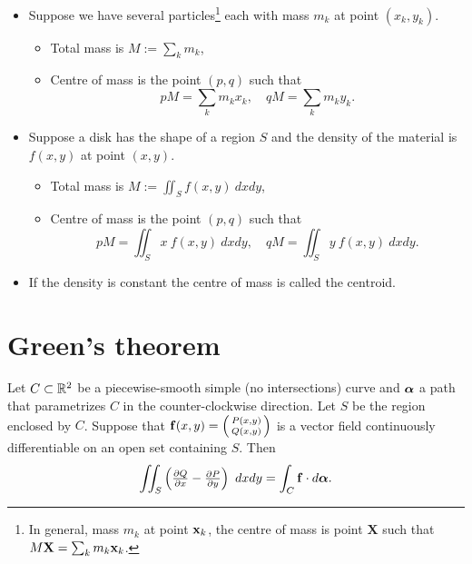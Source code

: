 \begin{itemize}
    \item Suppose we have several particles\footnote{In general, mass \(m_k\) at point \(\mathbf{x}_k\), the centre of mass is point \(\mathbf{X}\) such that \( M\mathbf{X} = \sum_{k} m_k \mathbf{x}_k\).} each with mass \(m_k\) at point \((x_k,y_k)\).
          \begin{itemize}
              \item Total mass is \(M := \sum_{k} m_k\),
              \item Centre of mass is the point \((p,q)\) such that
                    \[
                        p M = \sum_{k} m_k x_k,
                        \quad
                        q M = \sum_{k} m_k y_k.
                    \]
          \end{itemize}
    \item Suppose a disk has the shape of a region \(S\) and the density of the material is \(f(x,y)\) at point \((x,y)\).
          \begin{itemize}
              \item Total mass is \(M := \iint_{S} f(x,y) \ dxdy\),
              \item Centre of mass is the point \((p,q)\) such that
                    \[
                        p M = \iint_{S} x \ f(x,y) \ dxdy,
                        \quad
                        q M = \iint_{S} y \ f(x,y) \ dxdy.
                    \]
          \end{itemize}
    \item If the density is constant the centre of mass is called the centroid.
\end{itemize}




\section{Green's theorem}

\begin{theorem}
    Let \(C\subset\mathbb{R}^2\) be a piecewise-smooth simple (no intersections) curve and \(\boldsymbol{\alpha}\) a path that parametrizes \(C\) in the counter-clockwise direction.
    Let \(S\) be the region enclosed by \(C\).
    Suppose that \(\mathbf{f}(x,y) = \left(\begin{smallmatrix}
            P(x,y) \\ Q(x,y)
        \end{smallmatrix}\right)\) is a vector field continuously differentiable  on an open set containing \(S\).
    Then
    \[
        \iint_{S} \left(\tfrac{\partial Q}{\partial x} - \tfrac{\partial P}{\partial y}\right) \ dxdy = \int_{C} \mathbf{f} \cdot d\boldsymbol{\alpha}.
    \]
\end{theorem}

